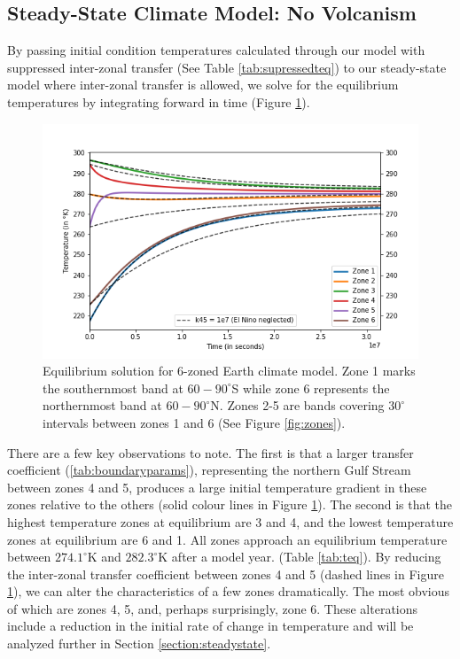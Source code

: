 \documentclass{article}
\begin{document}
\subsection{Steady-State Climate Model: No Volcanism}
By passing initial condition temperatures calculated through our model with
suppressed inter-zonal transfer (See Table \ref{tab:supressedteq}) to our
steady-state model where inter-zonal transfer is allowed, we solve for the
equilibrium temperatures by integrating forward in time
(Figure \ref{fig:steadystate}).

\begin{figure}[h]
    \centering
    \includegraphics[scale=0.5]{Question2.png}
    \caption{
        Equilibrium solution for 6-zoned Earth climate model. Zone 1 marks the
        southernmost band at $60-90^{\circ}$S while zone 6 represents the
        northernmost band at $60-90^{\circ}$N. Zones 2-5 are bands covering
        $30^{\circ}$ intervals between zones 1 and 6
        (See Figure \ref{fig:zones}).
    }
    \label{fig:steadystate}
\end{figure}
\FloatBarrier

There are a few key observations to note. The first is that a larger transfer
coefficient (\ref{tab:boundaryparams}), representing the northern Gulf Stream
between zones 4 and 5, produces a large initial temperature gradient in these
zones relative to the others (solid colour lines in Figure
\ref{fig:steadystate}). The second is that the highest temperature zones at
equilibrium are 3 and 4, and the lowest temperature zones at equilibrium are 6
and 1. All zones approach an equilibrium temperature between $274.1^{\circ}$K
and $282.3^{\circ}$K after a model year. (Table \ref{tab:teq}). By reducing the
inter-zonal transfer coefficient between zones 4 and 5
(dashed lines in Figure \ref{fig:steadystate}), we can alter the characteristics
of a few zones dramatically. The most obvious of which are zones 4, 5, and,
perhaps surprisingly, zone 6. These alterations include a reduction in the
initial rate of change in temperature and will be analyzed further in Section
\ref{section:steadystate}.
\end{document}
